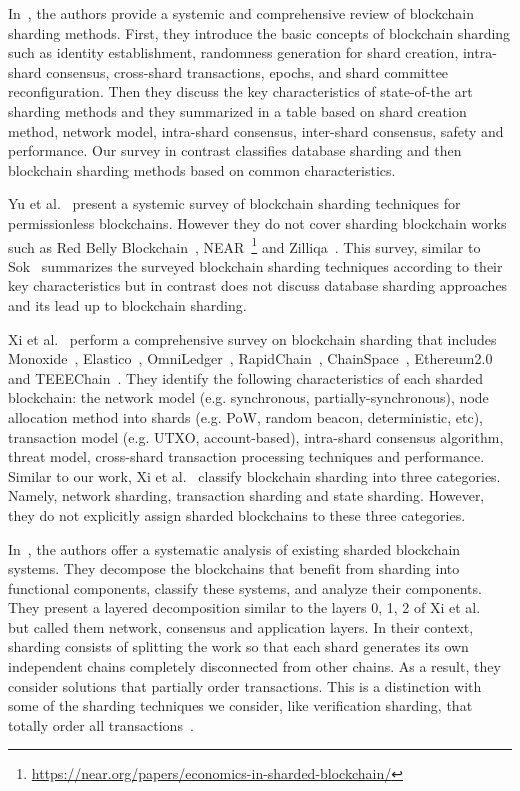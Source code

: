 \documentclass[11pt,dvipdfm]{article}
\begin{document}
In~\cite{WSN19}, the authors provide 
a systemic and comprehensive review of blockchain sharding methods. First, 
they
introduce the basic concepts of blockchain sharding such as identity establishment, randomness generation for shard creation, intra-shard consensus, cross-shard transactions, epochs, and shard committee reconfiguration. Then they discuss the key characteristics of state-of-the art sharding methods and they summarized in a table based on shard creation method, network model, intra-shard consensus, inter-shard consensus, safety and performance. Our survey in contrast classifies database sharding and then blockchain sharding methods based on common characteristics. 

Yu et al.~\cite{YWY20} present a systemic survey of blockchain sharding techniques for permissionless blockchains. However they do not cover sharding blockchain works such as Red Belly Blockchain~\cite{CNG21}, NEAR~\footnote{\url{https://near.org/papers/economics-in-sharded-blockchain/}} and Zilliqa~\cite{ZilliqaPaper}. This survey, similar to Sok~\cite{WSN19} summarizes the surveyed blockchain sharding techniques according to their key characteristics but in contrast does not discuss database sharding approaches and its lead up to blockchain sharding.

Xi et al.~\cite{XZX21} perform a comprehensive survey on blockchain sharding that includes Monoxide~\cite{227661}, Elastico~\cite{LNZ16}, OmniLedger~\cite{KJGG17}, RapidChain~\cite{ZMR18}, ChainSpace~\cite{ASB18}, Ethereum2.0~\cite{Eth2} and TEEEChain~\cite{DBLP:journals/corr/LindEKNPS17}. They identify the following characteristics of each sharded blockchain: the network model (e.g. synchronous, partially-synchronous), node allocation method into shards (e.g. PoW, random beacon, deterministic, etc), transaction model (e.g. UTXO, account-based), intra-shard consensus algorithm, threat model, cross-shard transaction processing techniques and performance. Similar to our work, Xi et al.~\cite{XZX21} classify blockchain sharding into three categories. Namely, network sharding, transaction sharding and state sharding. However, they do not explicitly assign sharded blockchains to these three categories.

In~\cite{LLV21}, the authors offer a systematic analysis of existing sharded blockchain systems. They decompose the blockchains that benefit from sharding into functional components, classify these systems, and analyze their components. They present a layered decomposition similar to the layers 0, 1, 2 of Xi et al.~\cite{XZX21} but called them network, consensus and application layers. In their context, sharding 
consists of splitting the work so that each shard generates its own independent chains completely disconnected from other chains. As a result, they consider solutions that partially order transactions. This is a distinction with some of the sharding techniques we consider, like verification sharding, that totally order all transactions~\cite{CNG21}.
\end{document}
